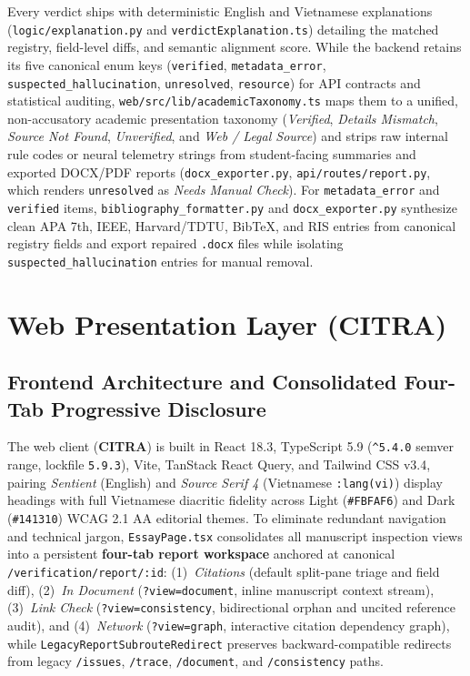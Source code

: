 Every verdict ships with deterministic English and Vietnamese explanations (\texttt{logic/explanation.py} and \texttt{verdictExplanation.ts}) detailing the matched registry, field-level diffs, and semantic alignment score. While the backend retains its five canonical enum keys (\texttt{verified}, \texttt{metadata\_error}, \texttt{suspected\_hallucination}, \texttt{unresolved}, \texttt{resource}) for API contracts and statistical auditing, \texttt{web/src/lib/academicTaxonomy.ts} maps them to a unified, non-accusatory academic presentation taxonomy (\textit{Verified}, \textit{Details Mismatch}, \textit{Source Not Found}, \textit{Unverified}, and \textit{Web / Legal Source}) and strips raw internal rule codes or neural telemetry strings from student-facing summaries and exported DOCX/PDF reports (\texttt{docx\_exporter.py}, \texttt{api/routes/report.py}, which renders \texttt{unresolved} as \textit{Needs Manual Check}). For \texttt{metadata\_error} and \texttt{verified} items, \texttt{bibliography\_formatter.py} and \texttt{docx\_exporter.py} synthesize clean APA 7th, IEEE, Harvard/TDTU, BibTeX, and RIS entries from canonical registry fields and export repaired \texttt{.docx} files while isolating \texttt{suspected\_hallucination} entries for manual removal.

\section{Web Presentation Layer (CITRA)}

\subsection{Frontend Architecture and Consolidated Four-Tab Progressive Disclosure}

The web client (\textbf{CITRA}) is built in React 18.3, TypeScript 5.9 (\texttt{\string^5.4.0} semver range, lockfile \texttt{5.9.3}), Vite, TanStack React Query, and Tailwind CSS v3.4, pairing \textit{Sentient} (English) and \textit{Source Serif 4} (Vietnamese \texttt{:lang(vi)}) display headings with full Vietnamese diacritic fidelity across Light (\texttt{\#FBFAF6}) and Dark (\texttt{\#141310}) WCAG 2.1 AA editorial themes. To eliminate redundant navigation and technical jargon, \texttt{EssayPage.tsx} consolidates all manuscript inspection views into a persistent \textbf{four-tab report workspace} anchored at canonical \texttt{/verification/report/:id}: (1)~\textit{Citations} (default split-pane triage and field diff), (2)~\textit{In Document} (\texttt{?view=document}, inline manuscript context stream), (3)~\textit{Link Check} (\texttt{?view=consistency}, bidirectional orphan and uncited reference audit), and (4)~\textit{Network} (\texttt{?view=graph}, interactive citation dependency graph), while \texttt{LegacyReportSubrouteRedirect} preserves backward-compatible redirects from legacy \texttt{/issues}, \texttt{/trace}, \texttt{/document}, and \texttt{/consistency} paths.

